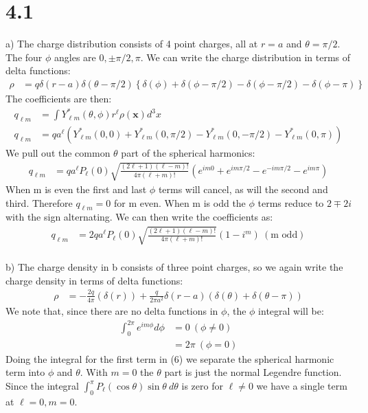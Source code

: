 \documentclass[a4paper,11pt]{article}
\numberwithin{equation}{section}
\newcommand{\bv}[1]{\mathbf{#1}}
\newcommand{\lrp}[1]{\left({#1}\right)}
\newcommand{\lrb}[1]{\left\{{#1}\right\}}
\begin{document}
\section{4.1}
a) The charge distribution consists of 4 point charges, all at $r=a$ and $\theta = \pi/2$.
The four $\phi$ angles are $0, \pm\pi/2, \pi$. 
We can write the charge distribution in terms of delta functions:
\begin{align}
 \rho &= q\delta(r-a)\delta(\theta-\pi/2)\lrb{\delta(\phi)+\delta(\phi-\pi/2)-\delta(\phi-\pi/2)-\delta(\phi-\pi)}
\end{align}
The coefficients are then:
\begin{align}
 q_{\ell m} &= \int Y_{\ell m}^*(\theta,\phi)r^\ell \rho(\bv{x}) d^3x\\
 q_{\ell m} &= qa^\ell \lrp{Y_{\ell m}^*(0,0)+Y_{\ell m}^*(0,\pi/2)-Y_{\ell m}^*(0,-\pi/2)-Y_{\ell m}^*(0,\pi)}
\end{align}
We pull out the common $\theta$ part of the spherical harmonics:
\begin{align}
 q_{\ell m} &= qa^\ell P_\ell(0)\sqrt{ \frac{(2\ell+1)(\ell-m)!}{4\pi(\ell+m)!} } \lrp{e^{im0}+e^{im\pi/2}-e^{-im\pi/2}-e^{im\pi}}
\end{align}
When m is even the first and last $\phi$ terms will cancel, as will the second and third. Therefore $q_{\ell m}=0$ for m even.
When m is odd the $\phi$ terms reduce to $2\mp2i$ with the sign alternating.
We can then write the coefficients as:
\begin{align}
 q_{\ell m} &= 2qa^\ell P_\ell(0)\sqrt{ \frac{(2\ell+1)(\ell-m)!}{4\pi(\ell+m)!} } \lrp{1-i^m}\ (\text{m odd})
\end{align}
\\
b) The charge density in b consists of three point charges, so we again write the charge density in terms of delta functions:
\begin{align}
 \rho &= -\frac{2q}{4\pi}(\delta(r))+\frac{q}{2\pi a^2}\delta(r-a)\lrp{\delta(\theta)+\delta(\theta-\pi)}
\end{align}
We note that, since there are no delta functions in $\phi$, the $\phi$ integral will be:
\begin{align}
 \int_0^{2\pi}e^{im\phi}d\phi &= 0\ (\phi\ne 0)\\
      &= 2\pi\ (\phi=0)
\end{align}
Doing the integral for the first term in (6) we separate the spherical harmonic term into $\phi$ and $\theta$.
With $m=0$ the $\theta$ part is just the normal Legendre function.
Since the integral $\int_0^\pi P_\ell(\cos\theta)\sin{\theta}\ d\theta$ is zero for $\ell\ne 0$ we have a single term at $\ell=0,m=0$.
\end{document}

